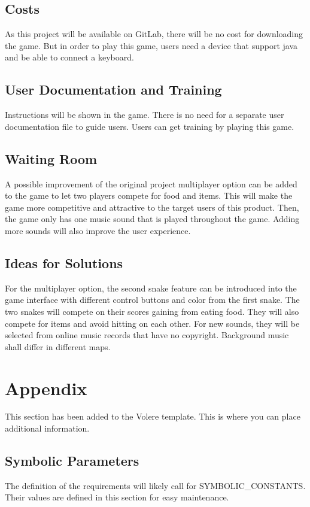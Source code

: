 \documentclass[12pt, titlepage]{article}
\begin{document}
\subsection{Costs}
    As this project will be available on GitLab, there will be no cost for downloading the game. But in order to play this game, users need a device that support java and be able to connect a keyboard.
\subsection{User Documentation and Training}
    Instructions will be shown in the game. There is no need for a separate user documentation file to guide users. Users can get training by playing this game.
\subsection{Waiting Room}
	A possible improvement of the original project multiplayer option can be added to the game to let two players compete for food and items. This will make the game more competitive and attractive to the target users of this product. Then, the game only has one music sound that is played throughout the game. Adding more sounds will also improve the user experience.

\subsection{Ideas for Solutions}
    For the multiplayer option, the second snake feature can be introduced into the game interface with different control buttons and color from the first snake. The two snakes will compete on their scores gaining from eating food. They will also compete for items and avoid hitting on each other. For new sounds, they will be selected from online music records that have no copyright. Background music shall differ in different maps.




\newpage

\section{Appendix}

This section has been added to the Volere template.  This is where you can place
additional information.

\subsection{Symbolic Parameters}

The definition of the requirements will likely call for SYMBOLIC\_CONSTANTS.
Their values are defined in this section for easy maintenance.
\end{document}
